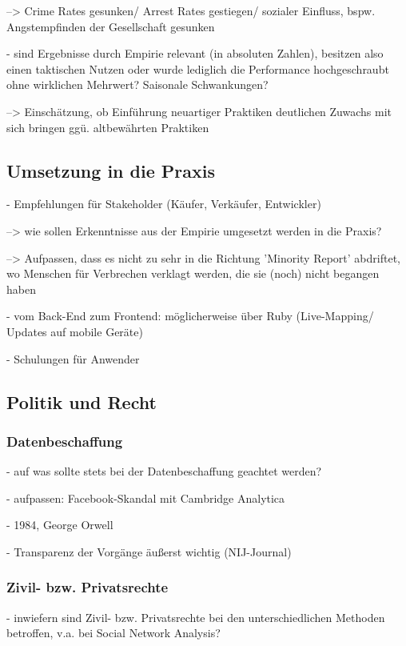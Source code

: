 \documentclass[a4paper,12pt,parskip,bibtotoc,liststotoc]{article}
\begin{document}
--> Crime Rates gesunken/ Arrest Rates gestiegen/ sozialer Einfluss, bspw. Angstempfinden der Gesellschaft gesunken

- sind Ergebnisse durch Empirie relevant (in absoluten Zahlen), besitzen also einen taktischen Nutzen oder wurde lediglich die Performance hochgeschraubt ohne wirklichen Mehrwert? Saisonale Schwankungen?

--> Einschätzung, ob Einführung neuartiger Praktiken deutlichen Zuwachs mit sich bringen ggü. altbewährten Praktiken



\subsection{Umsetzung in die Praxis}
- Empfehlungen für Stakeholder (Käufer, Verkäufer, Entwickler) 

--> wie sollen Erkenntnisse aus der Empirie umgesetzt werden in die Praxis? 

--> Aufpassen, dass es nicht zu sehr in die Richtung 'Minority Report' abdriftet, wo Menschen für Verbrechen verklagt werden, die sie (noch) nicht begangen haben

- vom Back-End zum Frontend: möglicherweise über Ruby (Live-Mapping/ Updates auf mobile Geräte)

- Schulungen für Anwender


\subsection{Politik und Recht}

\subsubsection{Datenbeschaffung}

- auf was sollte stets bei der Datenbeschaffung geachtet werden?

- aufpassen: Facebook-Skandal mit Cambridge Analytica

- 1984, George Orwell

- Transparenz der Vorgänge äußerst wichtig (NIJ-Journal)

\subsubsection{Zivil- bzw. Privatsrechte}
- inwiefern sind Zivil- bzw. Privatsrechte bei den unterschiedlichen Methoden betroffen, v.a. bei Social Network Analysis? 
\end{document}
